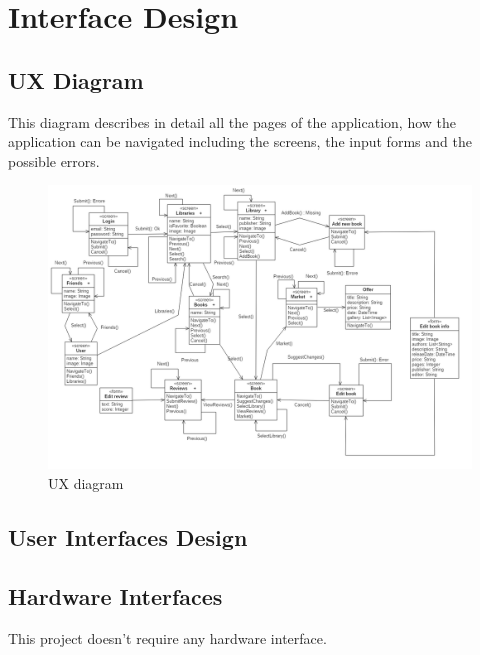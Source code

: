 \chapter{Interface Design}
\section{UX Diagram}
This diagram describes in detail all the pages of the application, how the application can
be navigated including the screens, the input forms and the possible errors.\\

\begin{figure}[!ht]
    \centering
	\includegraphics[scale=0.39]{images/ux-diagram.png}
	\caption{UX diagram}
	\label{fig:uxdiagram}
\end{figure}
\clearpage
\section{User Interfaces Design}
\section{Hardware Interfaces}
This project doesn’t require any hardware interface.
